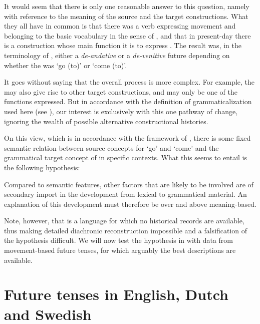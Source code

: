 \documentclass[output=paper]{langsci/langscibook}
\begin{document}
It would seem that there is only one reasonable answer to this question, name\-ly with reference to the meaning of the source and the target constructions. What they all have in common is that there was a verb expressing  movement and belonging to the basic vocabulary in the sense of \citet{Swadesh1952}, and that in present-day  there is a construction whose main function it is to express . The result was, in the terminology of \citet{Dahl2000}, either a \textit{de-andative} or a \textit{de-venitive} future depending on whether the  was `go (to)' or `come (to)'.


  It goes without saying that the overall process is more complex. For example, the  may also give rise to other target constructions, and  may only be one of the functions expressed. But in accordance with the definition of grammaticalization used here (see ), our interest is exclusively with this one pathway of change, ignoring the wealth of possible alternative constructional histories.

  On this view, which is in accordance with the framework of \citet{HeineEtAl1991}, there is some fixed semantic relation between source concepts for `go' and `come' and the grammatical target concept of  in specific contexts. What this seems to entail is the following hypothesis: 

\ea \label{ex:heine:9}
Compared to semantic features, other factors that are likely to be involved are of secondary import in the development from lexical to grammatical material. An explanation of this development must therefore be over and above meaning-based. 
\z


Note, however, that  is a language for which no historical records are available, thus making detailed diachronic reconstruction impossible and a falsification of the hypothesis difficult. We will now test the hypothesis in  with data from  movement-based future tenses, for which arguably the best descriptions are available. 

\section{Future tenses in English, Dutch and Swedish}\label{sec:heine:3}
\end{document}
